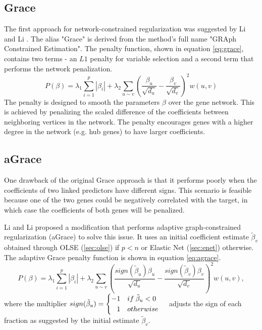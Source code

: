 \subsection{Grace}
The first approach for network-constrained regularization was suggested by Li and Li \cite{li2008network}. The alias "Grace" is derived from the method's full name "GRAph Constrained Estimation". The penalty function, shown in equation \ref{eq:grace}, contains two terms - an $L1$ penalty for variable selection and a second term that performs the network penalization.  
\begin{equation} \label{eq:grace}
P(\beta) = \lambda_1\sum_{i=1}^{p}\left|\beta_i\right| + \lambda_2\sum_{u \sim v}\left(\frac{\beta_u}{\sqrt{d_u}}-\frac{\beta_v}{\sqrt{d_v}}\right)^2w(u,v)
\end{equation}
The penalty is designed to smooth the parameters $\beta$ over the gene network. This is achieved by penalizing the scaled difference of the coefficients between neighboring vertices in the network. The penalty encourages genes with a higher degree in the network (e.g. hub genes) to have larger coefficients.


\subsection{aGrace}
One drawback of the original Grace approach is that it performs poorly when the coefficients of two linked predictors have different signs. This scenario is feasible because one of the two genes could be negatively correlated with the target, in which case the coefficients of both genes will be penalized.  

Li and Li proposed a modification \cite{li2010variable} that performs adaptive graph-constrained regularization (aGrace) to solve this issue. It uses an initial coefficient estimate $\tilde{\beta}_v$ obtained through OLSE (\ref{sec:olse}) if $p<n$ or Elastic Net (\ref{sec:enet}) otherwise. The adaptive Grace penalty function is shown in equation \ref{eq:agrace}.
\begin{equation} \label{eq:agrace}
P(\beta) = \lambda_1\sum_{i=1}^{p}\left|\beta_i\right| + \lambda_2\sum_{u \sim v}\left(\frac{sign(\tilde{\beta}_u)\beta_u}{\sqrt{d_u}}-\frac{sign(\tilde{\beta}_v)\beta_v}{\sqrt{d_v}}\right)^2w(u,v),
\end{equation}
where the multiplier $sign(\tilde{\beta}_u) = \left\{ \begin{aligned} -1 &\quad if \: \tilde{\beta}_u < 0 \cr 1 &\quad otherwise \end{aligned} \right.$ adjusts the sign of each fraction as suggested by the initial estimate $\tilde{\beta}_v$.


